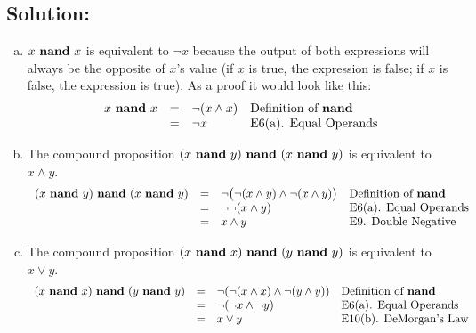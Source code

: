 \documentclass[12pt]{article}
\begin{document}
	\subsection*{\textbf{Solution:}}
	\begin{enumerate}[(a)]
		\item $x \ \mbox{\bf nand}\ x$ is equivalent to $\neg x$ because the output of
			both expressions will always be the opposite of $x$'s value (if $x$ is
			true, the expression is false; if $x$ is false, the expression is true). As
			a proof it would look like this:
			\[
				\begin{array}{rcll}
					x \ \mbox{\bf nand}\ x & = & \neg(x \wedge x) & \mbox{Definition of {\bf nand}} \\
					                       & = & \neg x           & \mbox{E6(a). Equal Operands}
				\end{array}
			\]

		\item The compound proposition $(x \ \mbox{\bf nand}\ y) \ \mbox{\bf nand}\ (
			x \ \mbox{\bf nand}\ y)$ is equivalent to $x \wedge y$.
			\[
				\begin{array}{rcll}
					(x \ \mbox{\bf nand}\ y) \ \mbox{\bf nand}\ (x \ \mbox{\bf nand}\ y) & = & \neg\bigl(\neg(x \wedge y) \wedge \neg(x \wedge y)\bigr) & \mbox{Definition of {\bf nand}} \\
					                                                                     & = & \neg\neg(x \wedge y)                                     & \mbox{E6(a). Equal Operands}    \\
					                                                                     & = & x \wedge y                                               & \mbox{E9. Double Negative}
				\end{array}
			\]

		\item The compound proposition $(x \ \mbox{\bf nand}\ x) \ \mbox{\bf nand}\ (
			y \ \mbox{\bf nand}\ y)$ is equivalent to $x \vee y$.
			\[
				\begin{array}{rcll}
					(x \ \mbox{\bf nand}\ x) \ \mbox{\bf nand}\ (y \ \mbox{\bf nand}\ y) & = & \neg(\neg(x \wedge x) \wedge \neg(y \wedge y)) & \mbox{Definition of {\bf nand}} \\
					                                                                     & = & \neg(\neg x \wedge \neg y)                     & \mbox{E6(a). Equal Operands}    \\
					                                                                     & = & x \vee y                                       & \mbox{E10(b). DeMorgan's Law}
				\end{array}
			\]
	\end{enumerate}
\end{document}

